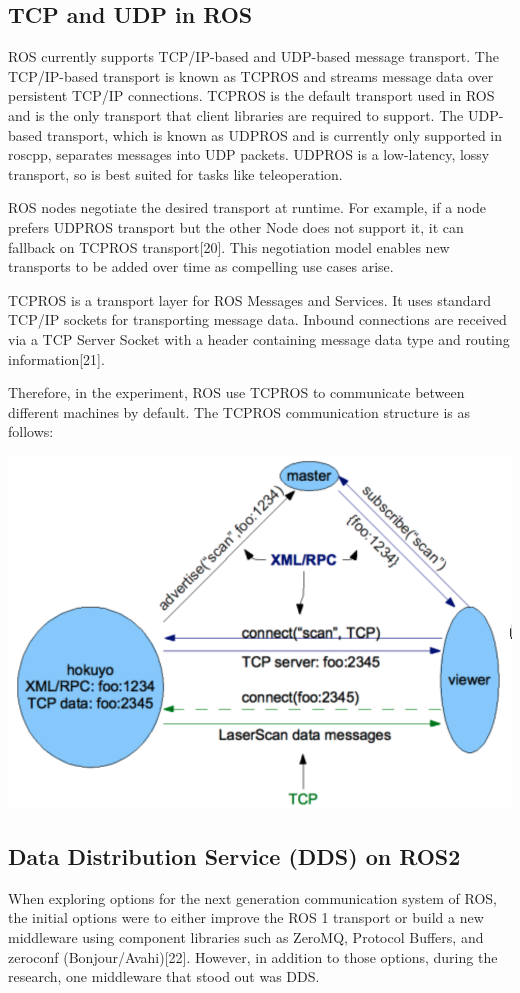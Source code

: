 \documentclass{mproj}
\begin{document}
\subsection{TCP and UDP in ROS}

ROS currently supports TCP/IP-based and UDP-based message transport. The TCP/IP-based transport is known as TCPROS and streams message data over persistent TCP/IP connections. TCPROS is the default transport used in ROS and is the only transport that client libraries are required to support. The UDP-based transport, which is known as UDPROS and is currently only supported in roscpp, separates messages into UDP packets. UDPROS is a low-latency, lossy transport, so is best suited for tasks like teleoperation.

ROS nodes negotiate the desired transport at runtime. For example, if a node prefers UDPROS transport but the other Node does not support it, it can fallback on TCPROS transport[20]. This negotiation model enables new transports to be added over time as compelling use cases arise.

TCPROS is a transport layer for ROS Messages and Services. It uses standard TCP/IP sockets for transporting message data. Inbound connections are received via a TCP Server Socket with a header containing message data type and routing information[21]. 

Therefore, in the experiment, ROS use TCPROS to communicate between different machines by default.
The TCPROS communication structure is as follows:

\includegraphics[width = .7\textwidth]{d.png}

\subsection{Data Distribution Service (DDS) on ROS2}
When exploring options for the next generation communication system of ROS, the initial options were to either improve the ROS 1 transport or build a new middleware using component libraries such as ZeroMQ, Protocol Buffers, and zeroconf (Bonjour/Avahi)[22]. However, in addition to those options, during the research, one middleware that stood out was DDS.
\end{document}
